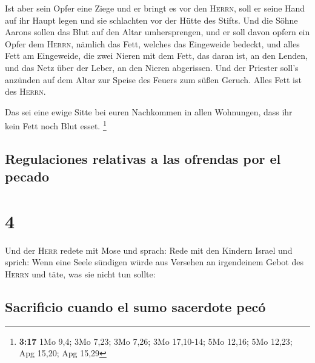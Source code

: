  Ist aber sein Opfer eine Ziege und er bringt es vor den
\textsc{Herrn},  soll er seine Hand auf ihr Haupt legen
und sie schlachten vor der Hütte des Stifts. Und die Söhne Aarons sollen
das Blut auf den Altar umhersprengen,  und er soll davon
opfern ein Opfer dem \textsc{Herrn}, nämlich das Fett, welches das
Eingeweide bedeckt, und alles Fett am Eingeweide,  die
zwei Nieren mit dem Fett, das daran ist, an den Lenden, und das Netz
über der Leber, an den Nieren abgerissen.  Und der
Priester soll's anzünden auf dem Altar zur Speise des Feuers zum süßen
Geruch. Alles Fett ist des \textsc{Herrn}.

 Das sei eine ewige Sitte bei euren Nachkommen in allen
Wohnungen, dass ihr kein Fett noch Blut esset. \footnote{\textbf{3:17}
  1Mo 9,4; 3Mo 7,23; 3Mo 7,26; 3Mo 17,10-14; 5Mo 12,16; 5Mo 12,23; Apg
  15,20; Apg 15,29}

\hypertarget{regulaciones-relativas-a-las-ofrendas-por-el-pecado}{%
\subsection{Regulaciones relativas a las ofrendas por el
pecado}\label{regulaciones-relativas-a-las-ofrendas-por-el-pecado}}

\hypertarget{section-3}{%
\section{4}\label{section-3}}

 Und der \textsc{Herr} redete mit Mose und sprach:
 Rede mit den Kindern Israel und sprich: Wenn eine Seele
sündigen würde aus Versehen an irgendeinem Gebot des \textsc{Herrn} und
täte, was sie nicht tun sollte:

\hypertarget{sacrificio-cuando-el-sumo-sacerdote-pecuxf3}{%
\subsection{Sacrificio cuando el sumo sacerdote
pecó}\label{sacrificio-cuando-el-sumo-sacerdote-pecuxf3}}

